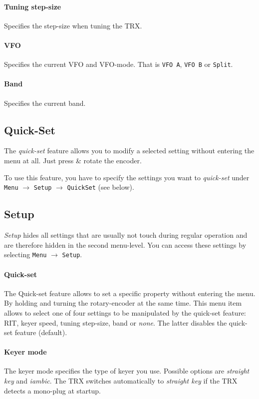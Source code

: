 \documentclass[10pt, a4paper,twoside]{scrartcl}
\begin{document}
\paragraph{Tuning step-size}
Specifies the step-size when tuning the TRX.

\paragraph{VFO}
Specifies the current VFO and VFO-mode. That is \texttt{VFO A}, \texttt{VFO B} or \texttt{Split}.

\paragraph{Band}
Specifies the current band. 


\subsection{Quick-Set}
The \emph{quick-set} feature allows you to modify a selected setting without entering the menu at all. Just press \& rotate the  encoder.

To use this feature, you have to specify the settings you want to \emph{quick-set} under \texttt{Menu} $\rightarrow$ \texttt{Setup} $\rightarrow$ \texttt{QuickSet} (see below).

\subsection{Setup}
\emph{Setup} hides all settings that are usually not touch during regular operation and are therefore hidden in the second menu-level. You can access these settings by selecting \texttt{Menu} $\rightarrow$ \texttt{Setup}.

\paragraph{Quick-set}
The Quick-set feature allows to set a specific property without entering the menu. By holding and turning the rotary-encoder at the same time. This menu item allows to select one of four settings to be manipulated by the quick-set feature: RIT, keyer speed, tuning step-size, band or \emph{none}. The latter disables the quick-set feature (default).

\paragraph{Keyer mode}
The keyer mode specifies the type of keyer you use. Possible options are \emph{straight key} and \emph{iambic}. The TRX switches automatically to \emph{straight key} if the TRX detects a mono-plug at startup.
\end{document}
